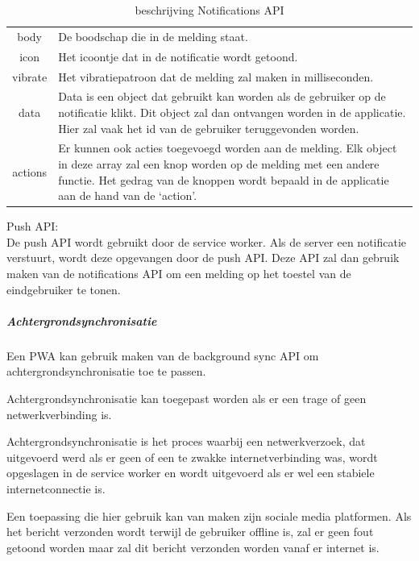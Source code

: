 			\begin{table}[H]
				\centering
				\begin{tabular}{cp{12cm}}
			       body & De boodschap die in de melding staat.  \\
			       icon & Het icoontje dat in de notificatie wordt getoond. \\
			       vibrate & Het vibratiepatroon dat de melding zal maken in milliseconden. \\
			       data & Data is een object dat gebruikt kan worden als de gebruiker op de notificatie  klikt. Dit object zal dan ontvangen worden in de applicatie. Hier zal vaak het id van de gebruiker teruggevonden worden. \\
			       actions & Er kunnen ook acties toegevoegd worden aan de melding. Elk object in deze array zal een knop worden op de melding met een andere functie. Het gedrag van de knoppen wordt bepaald in de applicatie aan de hand van de ‘action’. \\
				\end{tabular}	
				\caption{beschrijving Notifications API}
			\end{table}
			\autocite{Developers2019}
			\autocite{Mozilla2019a}
			

			Push API:	\\
	
				
			De push API wordt gebruikt door de service worker. Als de server een notificatie verstuurt, wordt deze opgevangen door de push API. Deze API zal dan gebruik maken van de notifications API om een melding op het toestel van de eindgebruiker te tonen.
			\autocite{Mozilla2019b}
			\autocite{Gaunt2020}
	
		\subparagraph{Achtergrondsynchronisatie }
		Een PWA kan gebruik maken van de background sync API om achtergrondsynchronisatie toe te passen.
		
		Achtergrondsynchronisatie kan toegepast worden als er een trage of geen netwerkverbinding is. 
		
		Achtergrondsynchronisatie is het proces waarbij een netwerkverzoek, dat uitgevoerd werd als er geen of een te zwakke internetverbinding was, wordt opgeslagen in de service worker en wordt uitgevoerd als er wel een stabiele internetconnectie is.
	
		Een toepassing die hier gebruik kan van maken zijn sociale media platformen. Als het bericht verzonden wordt terwijl de gebruiker offline is, zal er geen fout getoond worden maar zal dit bericht verzonden worden vanaf er internet is.
		
